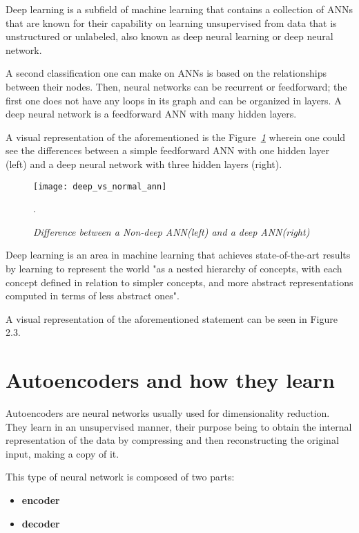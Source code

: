 Deep learning is a subfield of machine learning that contains a collection of ANNs that are known for
their capability on learning unsupervised from data that is unstructured or unlabeled,
also known as deep neural learning or deep neural network.

A second classification one can make on ANNs is based on the relationships between their nodes.
Then, neural networks can be recurrent or feedforward;
the first one does not have any loops in its graph and can be organized in layers.
A deep neural network is a feedforward ANN with many hidden layers.

A visual representation of the aforementioned is the Figure\emph{~\ref{fig:deep_vs_normal}}
wherein one could see the differences between a simple feedforward ANN with one
hidden layer (left) and a deep neural network with three hidden layers (right).
\begin{figure}[h]
  \centering
  \texttt{[image: deep\_vs\_normal\_ann]}
  \caption{\emph{Difference between a Non-deep ANN(left) and a deep ANN(right) \cite{deepLearningBook}}}.
  \label{fig:deep_vs_normal}
\end{figure}

Deep learning is an area in machine learning that achieves state-of-the-art
results by learning to represent the world "as a nested hierarchy of concepts,
with each concept defined in relation to simpler concepts,
and more abstract representations computed in terms of less abstract ones".\cite{Goodfellow-et-al-2016}

A visual representation of the aforementioned statement can be seen in Figure 2.3.



\section{Autoencoders and how they learn}

Autoencoders are neural networks usually used for dimensionality reduction.
They learn in an unsupervised manner,
their purpose being to obtain the internal representation of
the data by compressing and then reconstructing the original input,
making a copy of it.\cite{deepLearningBook}

This type of neural network is composed of two parts:

\begin{itemize}
  \item \textbf{encoder}
  \item \textbf{decoder}
\end{itemize}

